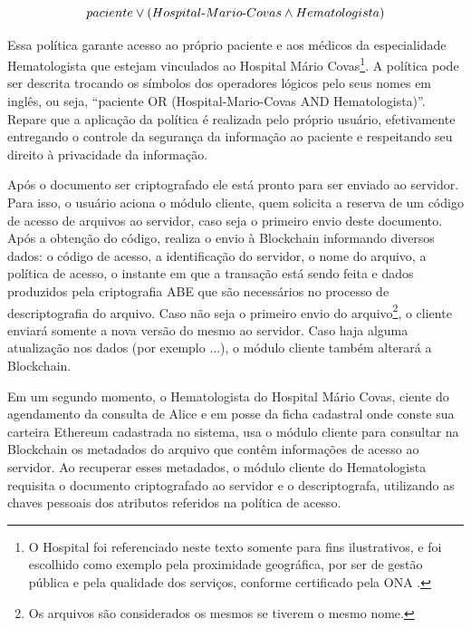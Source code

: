 \documentclass[a4paper,11pt]{article}
\begin{document}
\[paciente \vee (Hospital\textnormal{-}Mario\textnormal{-}Covas \wedge Hematologista)\] %

Essa política garante acesso ao próprio paciente e aos médicos da especialidade Hematologista que estejam vinculados ao Hospital Mário Covas\footnote{O Hospital foi referenciado neste texto somente para fins ilustrativos, e foi escolhido como exemplo pela proximidade geográfica, por ser de gestão pública e pela qualidade dos serviços, conforme certificado pela ONA \cite{ONA2020}.}.
A política pode ser descrita trocando os símbolos dos operadores lógicos pelo seus nomes em inglês, ou seja, ``paciente OR (Hospital-Mario-Covas AND Hematologista)''. %
Repare que a aplicação da política é realizada pelo próprio usuário, efetivamente entregando o controle da segurança da informação ao paciente e respeitando seu direito à privacidade da informação.

Após o documento ser criptografado ele está pronto para ser enviado ao servidor.
Para isso, o usuário aciona o módulo cliente, quem solicita a reserva de um código de acesso de arquivos ao servidor, caso seja o primeiro envio deste documento.
Após a obtenção do código, realiza o envio à Blockchain informando diversos dados: o código de acesso, a identificação do servidor, o nome do arquivo, a política de acesso, o instante em que a transação está sendo feita e dados produzidos pela criptografia ABE que são necessários no processo de descriptografia do arquivo.
Caso não seja o primeiro envio do arquivo\footnote{Os arquivos são considerados os mesmos se tiverem o mesmo nome.}, o cliente enviará somente a nova versão do mesmo ao servidor.
Caso haja alguma atualização nos dados ({\color{magenta}por exemplo ...}), o módulo cliente também alterará a Blockchain.

Em um segundo momento, o Hematologista do Hospital Mário Covas, ciente do agendamento da consulta de Alice e em posse da  ficha cadastral onde conste sua carteira Ethereum cadastrada no sistema, usa o módulo cliente para consultar na Blockchain os metadados do arquivo que contêm informações de acesso ao servidor. %
Ao recuperar esses metadados, o módulo cliente do Hematologista requisita o documento criptografado ao servidor e o descriptografa, utilizando as chaves pessoais dos atributos referidos na política de acesso.
\end{document}
